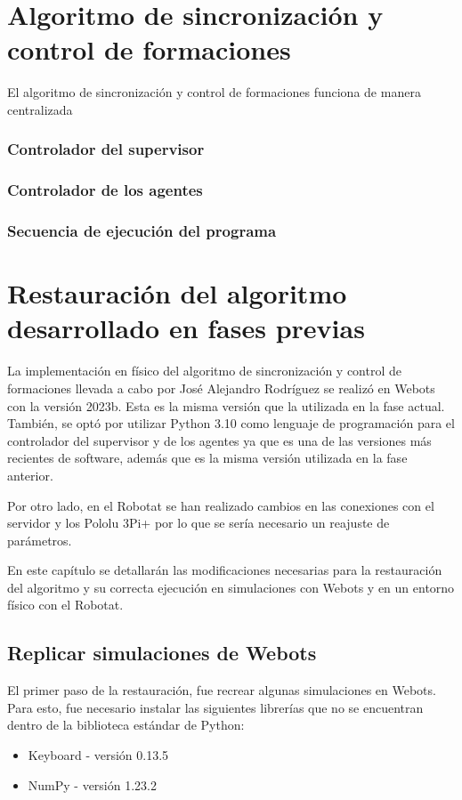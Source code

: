 \chapter{Algoritmo de sincronización y control de formaciones}
El algoritmo de sincronización y control de formaciones funciona de manera centralizada 


\subsection{Controlador del supervisor}
\subsection{Controlador de los agentes}
\subsection{Secuencia de ejecución del programa}


\chapter{Restauración del algoritmo desarrollado en fases previas}
La implementación en físico del algoritmo de sincronización y control de formaciones llevada a cabo por José Alejandro Rodríguez \cite{RodriguezJA_2023_tesis} se realizó en Webots con la versión 2023b. Esta es la misma versión que la utilizada en la fase actual. También, se optó por utilizar Python 3.10 como lenguaje de programación para el controlador del supervisor y de los agentes ya que es una de las versiones más recientes de software, además que es la misma versión utilizada en la fase anterior. 

Por otro lado, en el Robotat se han realizado cambios en las conexiones con el servidor y los Pololu 3Pi+	por lo que se sería necesario un reajuste de parámetros.

En este capítulo se detallarán las modificaciones necesarias para la restauración del algoritmo y su correcta ejecución en simulaciones con Webots y en un entorno físico con el Robotat.


\section{Replicar simulaciones de Webots}

El primer paso de la restauración, fue recrear algunas simulaciones en Webots. Para esto, fue necesario instalar las siguientes librerías que no se encuentran dentro de la biblioteca estándar de Python:
\begin{itemize}
	\item Keyboard - versión 0.13.5
	\item NumPy - versión 1.23.2
\end{itemize}

